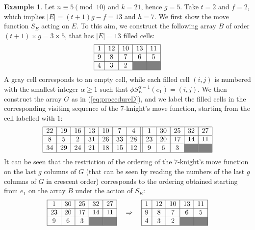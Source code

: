 \documentclass{amsart}
\theoremstyle{definition}
\newtheorem{ex}[prop]{Example}
\numberwithin{equation}{section}
\begin{document}
\begin{ex} \label{ex:D_example}
Let $n\equiv 5\pmod{10}$ and $k=21$, hence $g=5$. Take $t=2$ and $f = 2$, which implies
$|E|=(t+1)g-f=13$ and $h=7$.
We first show the move function $S_E$ acting on $E$. To this aim, we construct the following array $B$ of order $(t+1)\times g=3\times 5$, that has $|E|=13$ filled cells: 
\[
\begin{array}{|c|c|c|c|c|}\hline
1 &12 &10&13&11  \\ \hline
9&8&7&6&5  \\ \hline
4&3&2&\cellcolor{gray}&\cellcolor{gray}  \\ \hline
\end{array}
\]
A gray cell corresponds to an empty cell, while each filled cell $(i,j)$ is numbered with the smallest integer $\alpha \geq 1$ such that $\phi S_E^{\alpha-1}(e_1)=(i,j)$.
We then construct the array $G$ as in (\ref{eq:procedureD}), and we label the filled cells in the corresponding visiting sequence of the $7$-knight's move function, starting from the cell labelled with $1$:
\[
\begin{array}{|c|c|c|c|c|c|c||c|c|c|c|c|}\hline
22&19&16&13&10&7&4&1&30&25&32&27 \\ \hline
8&5&2&31&26&33&28&23&20&17&14&11 \\ \hline
34&29&24&21&18&15&12&9&6&3&\cellcolor{gray}&\cellcolor{gray} \\ \hline
\end{array}
\]
It can be seen that the restriction of the ordering of the $7$-knight's move function on the last $g$ columns of $G$ (that can be seen by reading the numbers of the last $g$ columns of $G$ in crescent order) corresponds to the ordering  obtained starting from $e_1$ on the array $B$ under the action of $S_E$:
\[
\begin{array}{|c|c|c|c|c|}\hline
1&30&25&32&27 \\ \hline
23&20&17&14&11 \\ \hline
9&6&3&\cellcolor{gray}&\cellcolor{gray} \\ \hline
\end{array}\quad
\Rightarrow \quad\begin{array}{|c|c|c|c|c|}\hline
1 &12 &10&13&11  \\ \hline
9&8&7&6&5  \\ \hline
4&3&2&\cellcolor{gray}&\cellcolor{gray}  \\ \hline
\end{array}
\]
\end{ex}
\end{document}
